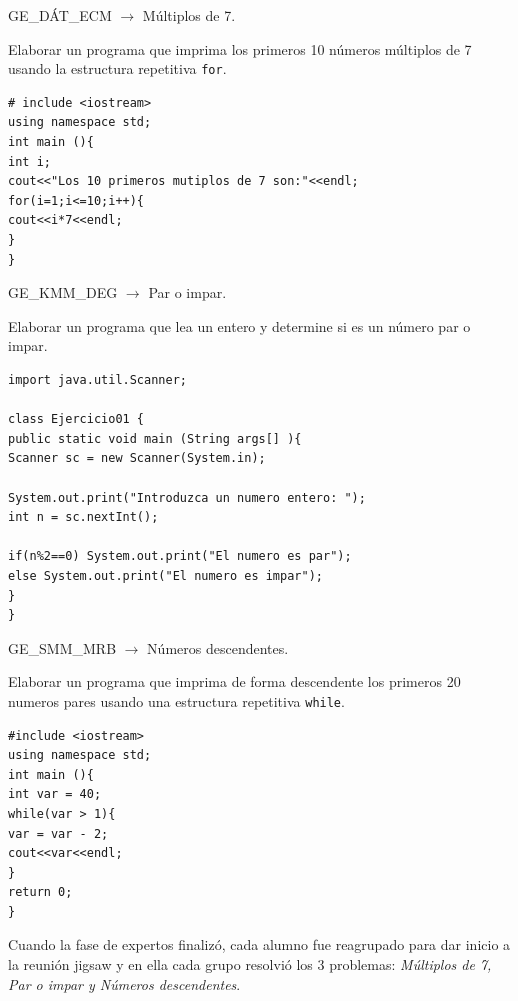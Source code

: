 \documentclass[twoside]{article}
\begin{document}
\begin{multicols}{2}
\begin{center}
	GE\_DÁT\_ECM $\longrightarrow$ Múltiplos de 7.
\end{center}

Elaborar un programa que imprima los primeros 10 números múltiplos de 7 usando la estructura repetitiva \texttt{for}.

\lstset{language=C, breaklines=true, basicstyle=\footnotesize}
\begin{lstlisting}
# include <iostream>
using namespace std;
int main (){
int i;
cout<<"Los 10 primeros mutiplos de 7 son:"<<endl;
for(i=1;i<=10;i++){
cout<<i*7<<endl;
}
}
\end{lstlisting}
\begin{center}
	GE\_KMM\_DEG $\longrightarrow$ Par o impar.
\end{center}

Elaborar un programa que lea un entero y determine si es un número par o impar.

\lstset{language=Java, breaklines=true, basicstyle=\footnotesize}
\begin{lstlisting}
import java.util.Scanner;

class Ejercicio01 {
public static void main (String args[] ){
Scanner sc = new Scanner(System.in);

System.out.print("Introduzca un numero entero: ");
int n = sc.nextInt();

if(n%2==0) System.out.print("El numero es par");
else System.out.print("El numero es impar");
}
}
\end{lstlisting}

\begin{center}
	GE\_SMM\_MRB $\longrightarrow$ Números descendentes.
\end{center}

Elaborar un programa que imprima de forma descendente los primeros 20 numeros pares usando una estructura repetitiva \texttt{while}.

\lstset{language=C, breaklines=true, basicstyle=\footnotesize}
\begin{lstlisting}
#include <iostream>
using namespace std;
int main (){
int var = 40;
while(var > 1){
var = var - 2;
cout<<var<<endl;
}
return 0;
}
\end{lstlisting}

Cuando la fase de expertos finalizó, cada alumno fue reagrupado para dar inicio a la reunión jigsaw y en ella cada grupo resolvió los 3 problemas: \emph{Múltiplos de 7, Par o impar y Números descendentes}. \\


\end{multicols}
\end{document}
